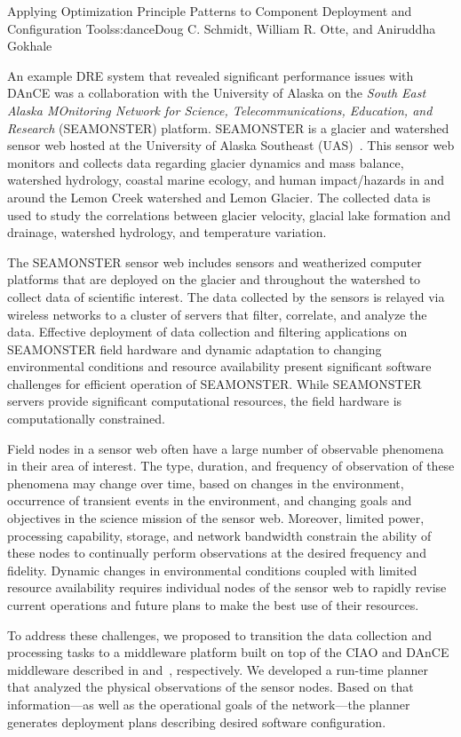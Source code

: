 \begin{aosachapter}{Applying Optimization Principle Patterns to Component Deployment and
                    Configuration Tools}{s:dance}{Doug C. Schmidt, William R. Otte, and Aniruddha Gokhale}

An example DRE system that revealed significant performance issues with
DAnCE was a collaboration with the University of Alaska on the
\emph{South East Alaska MOnitoring Network for Science,
Telecommunications, Education, and Research} (SEAMONSTER) platform.
SEAMONSTER is a glacier and watershed sensor web hosted at the
University of Alaska Southeast (UAS)~\cite{Fatland:07}. This sensor web
monitors and collects data regarding glacier dynamics and mass balance,
watershed hydrology, coastal marine ecology, and human impact/hazards in
and around the Lemon Creek watershed and Lemon Glacier. The collected
data is used to study the correlations between glacier velocity, glacial
lake formation and drainage, watershed hydrology, and temperature
variation.

The SEAMONSTER sensor web includes sensors and weatherized computer
platforms that are deployed on the glacier and throughout the watershed
to collect data of scientific interest. The data collected by the
sensors is relayed via wireless networks to a cluster of servers that
filter, correlate, and analyze the data. Effective deployment of data
collection and filtering applications on SEAMONSTER field hardware and
dynamic adaptation to changing environmental conditions and resource
availability present significant software challenges for efficient
operation of SEAMONSTER. While SEAMONSTER servers provide significant
computational resources, the field hardware is computationally
constrained.

Field nodes in a sensor web often have a large number of observable
phenomena in their area of interest. The type, duration, and frequency
of observation of these phenomena may change over time, based on changes
in the environment, occurrence of transient events in the environment,
and changing goals and objectives in the science mission of the sensor
web. Moreover, limited power, processing capability, storage, and
network bandwidth constrain the ability of these nodes to continually
perform observations at the desired frequency and fidelity. Dynamic
changes in environmental conditions coupled with limited resource
availability requires individual nodes of the sensor web to rapidly
revise current operations and future plans to make the best use of their
resources.

To address these challenges, we proposed to transition the data
collection and processing tasks to a middleware platform built on top of
the CIAO and DAnCE middleware described in 
and~, respectively. We developed a run-time
planner~\cite{Schmidt:08z} that analyzed the physical observations of
the sensor nodes. Based on that information---as well as the operational
goals of the network---the planner generates deployment plans describing
desired software configuration.


\end{aosachapter}
